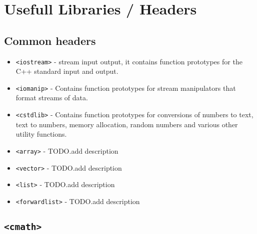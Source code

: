 \section{Usefull Libraries / Headers}
\label{sec:Libraries}
\subsection{Common headers}
\begin{itemize}
    \item \texttt{<iostream>} - stream input output, it contains function prototypes for the C++ standard input and output.
    
    \item \texttt{<iomanip>} - Contains function prototypes for stream manipulators that format streams of data.
    
    \item \texttt{<cstdlib>} - Contains function prototypes for conversions of numbers to text, text to numbers, memory allocation, random numbers and various other utility functions.
    
    \item \texttt{<array>} - TODO.add description
    \item \texttt{<vector>} - TODO.add description
    \item \texttt{<list>} - TODO.add description
    \item \texttt{<forwardlist>} - TODO.add description
\end{itemize}

\subsection{\texttt{<cmath>}}


